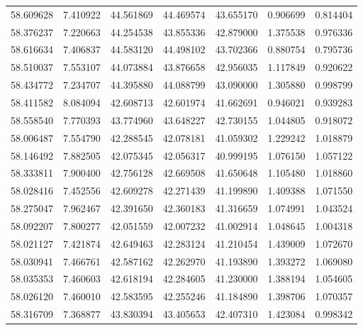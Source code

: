 \begin{tabular}{rrrrrrr}
 58.609628 &   7.410922 &         44.561869 &         44.469574 &         43.655170 &  0.906699 &  0.814404 \\
 58.376237 &   7.220663 &         44.254538 &         43.855336 &         42.879000 &  1.375538 &  0.976336 \\
 58.616634 &   7.406837 &         44.583120 &         44.498102 &         43.702366 &  0.880754 &  0.795736 \\
 58.510037 &   7.553107 &         44.073884 &         43.876658 &         42.956035 &  1.117849 &  0.920622 \\
 58.434772 &   7.234707 &         44.395880 &         44.088799 &         43.090000 &  1.305880 &  0.998799 \\
 58.411582 &   8.084094 &         42.608713 &         42.601974 &         41.662691 &  0.946021 &  0.939283 \\
 58.558540 &   7.770393 &         43.774960 &         43.648227 &         42.730155 &  1.044805 &  0.918072 \\
 58.006487 &   7.554790 &         42.288545 &         42.078181 &         41.059302 &  1.229242 &  1.018879 \\
 58.146492 &   7.882505 &         42.075345 &         42.056317 &         40.999195 &  1.076150 &  1.057122 \\
 58.333811 &   7.900400 &         42.756128 &         42.669508 &         41.650648 &  1.105480 &  1.018860 \\
 58.028416 &   7.452556 &         42.609278 &         42.271439 &         41.199890 &  1.409388 &  1.071550 \\
 58.275047 &   7.962467 &         42.391650 &         42.360183 &         41.316659 &  1.074991 &  1.043524 \\
 58.092207 &   7.800277 &         42.051559 &         42.007232 &         41.002914 &  1.048645 &  1.004318 \\
 58.021127 &   7.421874 &         42.649463 &         42.283124 &         41.210454 &  1.439009 &  1.072670 \\
 58.030941 &   7.466761 &         42.587162 &         42.262970 &         41.193890 &  1.393272 &  1.069080 \\
 58.035353 &   7.460603 &         42.618194 &         42.284605 &         41.230000 &  1.388194 &  1.054605 \\
 58.026120 &   7.460010 &         42.583595 &         42.255246 &         41.184890 &  1.398706 &  1.070357 \\
 58.316709 &   7.368877 &         43.830394 &         43.405653 &         42.407310 &  1.423084 &  0.998342 \\

\end{tabular}
